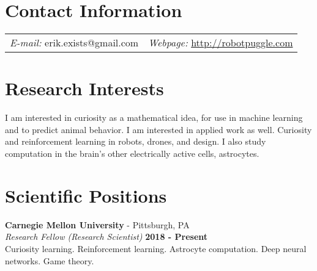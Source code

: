 \documentclass[margin,line]{res}
\begin{document}
\newcommand{\link}[1]{\texttt{#1}}
\providecommand{\tightlist}{%
      \setlength{\itemsep}{0pt}\setlength{\parskip}{0pt}}



\begin{resume}
\section{\sc Contact Information}
\vspace{.05in}
\begin{tabular}{@{}p{2in}p{4in}}
{\it E-mail:}  erik.exists@gmail.com   & {\it Webpage:} \href{http://robotpuggle.com}{http://robotpuggle.com} \\
\end{tabular}


\section{\sc Research Interests}

I am interested in curiosity as a mathematical idea, for use in machine learning and to predict animal behavior. I am interested in applied work as well. Curiosity and reinforcement learning in robots, drones, and design. I also study computation in the brain’s other electrically active cells, astrocytes.






\section{\sc Scientific Positions}

{\bf Carnegie Mellon University} - Pittsburgh, PA \\
{\em Research Fellow (Research Scientist)} \hfill {\bf 2018 - Present}\\
Curiosity learning. Reinforcement learning. Astrocyte computation. Deep neural networks. Game theory.


\end{resume}
\end{document}
